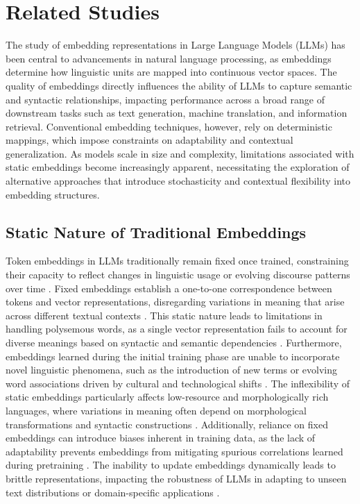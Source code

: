 \documentclass{article}
\begin{document}
\section{Related Studies}

The study of embedding representations in Large Language Models (LLMs) has been central to advancements in natural language processing, as embeddings determine how linguistic units are mapped into continuous vector spaces. The quality of embeddings directly influences the ability of LLMs to capture semantic and syntactic relationships, impacting performance across a broad range of downstream tasks such as text generation, machine translation, and information retrieval. Conventional embedding techniques, however, rely on deterministic mappings, which impose constraints on adaptability and contextual generalization. As models scale in size and complexity, limitations associated with static embeddings become increasingly apparent, necessitating the exploration of alternative approaches that introduce stochasticity and contextual flexibility into embedding structures. 

\subsection{Static Nature of Traditional Embeddings}

Token embeddings in LLMs traditionally remain fixed once trained, constraining their capacity to reflect changes in linguistic usage or evolving discourse patterns over time \cite{ harrington2024recursive}. Fixed embeddings establish a one-to-one correspondence between tokens and vector representations, disregarding variations in meaning that arise across different textual contexts \cite{atox2024evaluating}. This static nature leads to limitations in handling polysemous words, as a single vector representation fails to account for diverse meanings based on syntactic and semantic dependencies \cite{grushail2024adaptive, raines2024enhancing}. Furthermore, embeddings learned during the initial training phase are unable to incorporate novel linguistic phenomena, such as the introduction of new terms or evolving word associations driven by cultural and technological shifts \cite{quinn2024applying}. The inflexibility of static embeddings particularly affects low-resource and morphologically rich languages, where variations in meaning often depend on morphological transformations and syntactic constructions \cite{ashcroft2024evaluation}. Additionally, reliance on fixed embeddings can introduce biases inherent in training data, as the lack of adaptability prevents embeddings from mitigating spurious correlations learned during pretraining \cite{romanovna2024dynamic}. The inability to update embeddings dynamically leads to brittle representations, impacting the robustness of LLMs in adapting to unseen text distributions or domain-specific applications \cite{fossan2024semantic}. 
\end{document}
